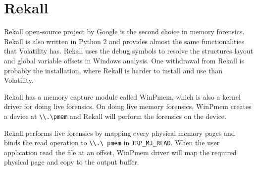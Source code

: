 \section[Rekall]{Rekall}

Rekall open-source project by Google \cite{rekall} is the second choice in
memory forensics.  Rekall is also written in Python 2 and provides almost the
same functionalities that Volatility has. Rekall uses the debug symbols to
resolve the structures layout and global variable offsets in Windows analysis.
One withdrawal from Rekall is probably the installation, where Rekall is harder
to install and use than Volatility.

Rekall has a memory capture module called WinPmem, which is also a kernel
driver for doing live forensics. On doing live memory forensics, WinPmem
creates a device at \texttt{\textbackslash\textbackslash .\textbackslash pmem}
and Rekall will perform the forensics on the device.

Rekall performs live forensics by mapping every physical memory pages and binds
the read operation to \texttt{\textbackslash\textbackslash .\textbackslash
pmem} in \texttt{IRP\_MJ\_READ}. When the user application read the file at an
offset, WinPmem driver will map the required physical page and copy to the
output buffer.
